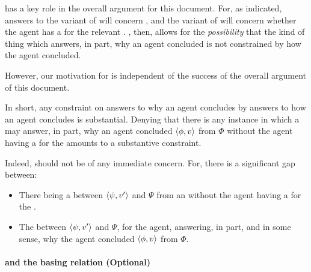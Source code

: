 \begin{note}
  \supportII{} has a key role in the overall argument for this document.
  For, as indicated, answers to the variant of \qWhy{} will concern \ros{}, and the variant of \qHow{} will concern whether the agent has a \wit{} for the relevant \ros{}.
  \supportII{}, then, allows for the \emph{possibility} that the kind of thing which answers, in part, why an agent concluded is not constrained by how the agent concluded.

  However, our motivation for \supportII{} is independent of the success of the overall argument of this document.

  In short, any constraint on answers to why an agent concludes by answers to how an agent concludes is substantial.
  Denying that there is any instance in which a \ros{} may answer, in part, why an agent concluded \(\langle \phi, v \rangle\) from \(\Phi\) without the agent having a \wit{} for the \ros{} amounts to a substantive constraint.

  Indeed, \supportII{} should not be of any immediate concern.
  For, there is a significant gap between:

  \begin{itemize}[noitemsep]
  \item
    There being a \ros{} between \(\langle \psi, v' \rangle\) and \(\Psi\) from an \agpe{} without the agent having a \wit{} for the \ros{}.
  \item
    The \ros{} between \(\langle \psi, v' \rangle\) and \(\Psi\), for the agent, answering, in part, and in some sense, why the agent concluded \(\langle \phi, v \rangle\) from \(\Phi\).
  \end{itemize}
\end{note}

\paragraph*{ and the basing relation \hfill (Optional)}

